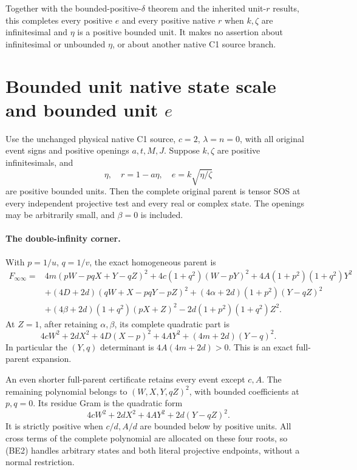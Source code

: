 Together with the bounded-positive-$\delta$ theorem and the inherited
unit-$r$ results, this completes every positive $e$ and every positive
native $r$ when $k,\zeta$ are infinitesimal and $\eta$ is a positive
bounded unit. It makes no assertion about infinitesimal or unbounded
$\eta$, or about another native C1 source branch.


\section{\texorpdfstring{Bounded unit native state scale and bounded unit $e$}{Bounded unit native state scale and bounded unit e}}
\label{component:p69995d829bb2}


\begin{theorem}
Use the unchanged physical native C1 source, $c=2$, $\lambda=n=0$,
with all original event signs and positive openings $a,t,M,J$.
Suppose $k,\zeta$ are positive infinitesimals, and
\[
 \eta,\quad r=1-a\eta,\quad e=k\sqrt{\eta/\zeta}
\]
are positive bounded units. Then the complete original parent is tensor
SOS at every independent projective test and every real or complex state.
The openings may be arbitrarily small, and $\beta=0$ is included.
\end{theorem}

\paragraph{The double-infinity corner.}
With $p=1/u$, $q=1/v$, the exact homogeneous parent is
\begin{align*}
F_{\infty\infty}={}&4m(pW-pqX+Y-qZ)^2
 +4c(1+q^2)(W-pY)^2+4A(1+p^2)(1+q^2)Y^2\\
&+(4D+2d)(qW+X-pqY-pZ)^2
 +(4\alpha+2d)(1+p^2)(Y-qZ)^2\\
&+(4\beta+2d)(1+q^2)(pX+Z)^2
 -2d(1+p^2)(1+q^2)Z^2.
\end{align*}
At $Z=1$, after retaining $\alpha,\beta$, its complete quadratic part is
\[
 4cW^2+2dX^2+4D(X-p)^2+4AY^2+(4m+2d)(Y-q)^2.
 \tag{BE1}
\]
In particular the $(Y,q)$ determinant is $4A(4m+2d)>0$.
This is an exact full-parent expansion.

An even shorter full-parent certificate retains every event except
$c,A$. The remaining polynomial belongs to $(W,X,Y,qZ)^2$, with bounded
coefficients at $p,q=0$. Its residue Gram is the quadratic form
\[
 4cW^2+2dX^2+4AY^2+2d(Y-qZ)^2.                 \tag{BE2}
\]
It is strictly positive when $c/d,A/d$ are bounded below by positive
units. All cross terms of the complete polynomial are allocated on
these four roots, so (BE2) handles arbitrary states and both literal
projective endpoints, without a normal restriction.

